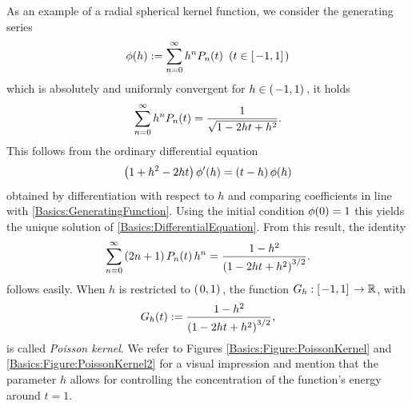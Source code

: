 As an example of a radial spherical kernel function, we consider the generating series
\begin{equation}
  \label{Basics:GeneratingFunction}
  \phi{\hspace{-0.4ex}}\left(h\right) := \sum_{n = 0}^{\infty} h^n P_n{\hspace{-0.4ex}}\left(t\right)\ \left(t \in \left[\left.-1,1\right]\right.\right)
\end{equation}
which is absolutely and uniformly convergent for $h \in
\left(\left.-1,1\right)\right.$, it holds
\begin{equation}
  \nonumber
  \sum_{n = 0}^{\infty} h^n P_n{\hspace{-0.4ex}}\left(t\right) = \frac{1}{\sqrt{1-2ht+h^2}}.
\end{equation}
This follows from the ordinary differential equation
\begin{equation}
\label{Basics:DifferentialEquation}
  \left(1+h^2-2ht\right)\phi'{\hspace{-0.4ex}}\left(h\right) = \left(t-h\right)\phi{\hspace{-0.4ex}}\left(h\right)
\end{equation}
obtained by differentiation with respect to $h$ and comparing coefficients in line with \eqref{Basics:GeneratingFunction}. Using the initial 
condition $\phi{\hspace{-0.4ex}}\left(0\right)=1$ this yields the unique solution of \eqref{Basics:DifferentialEquation}.
From this result, the identity
\begin{equation}
  \nonumber
  \sum_{n=0}^{\infty} \left(2n+1\right) P_n{\hspace{-0.4ex}}\left(t\right) h^n =
  \frac{1-h^2}{\left(1-2ht+h^2\right)^{3/2}}.
\end{equation}
 follows easily. When $h$ is restricted to $\left(\left.0,1\right)\right.$, the function
$G_h:\left[\left.-1,1\right]\right. \rightarrow \mathbb{R}$, with
\begin{equation}
  \label{PoissonKernel}
  \nonumber
  G_h{\hspace{-0.4ex}}\left(t\right) := \frac{1-h^2}{\left(1-2ht+h^2\right)^{3/2}},
\end{equation}
is called \emph{Poisson kernel}. We refer 
to Figures \ref{Basics:Figure:PoissonKernel} and \ref{Basics:Figure:PoissonKernel2}
for a visual impression and mention that the parameter $h$
allows for controlling the concentration of the function's energy around
$t = 1$.

